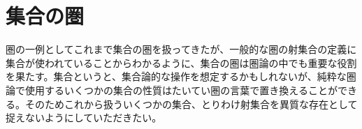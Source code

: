 \section{集合の圏}

  圏の一例としてこれまで集合の圏を扱ってきたが、一般的な圏の射集合の定義に集合が使われていることからわかるように、集合の圏は圏論の中でも重要な役割を果たす。集合というと、集合論的な操作を想定するかもしれないが、純粋な圏論で使用するいくつかの集合の性質はたいてい圏の言葉で置き換えることができる。そのためこれから扱ういくつかの集合、とりわけ射集合を異質な存在として捉えないようにしていただきたい。

  
  
  
  